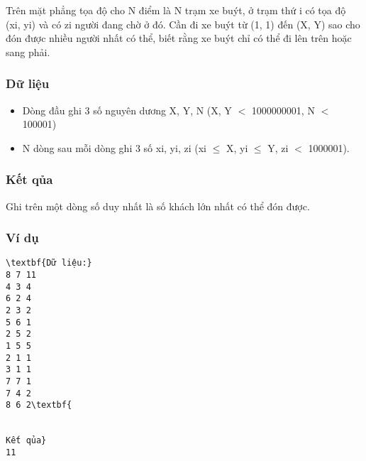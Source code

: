 



   Trên mặt phẳng tọa độ cho N điểm là N trạm xe buýt, ở trạm thứ i có tọa độ (xi, yi) và có zi người đang chờ ở đó. Cần đi xe buýt từ (1, 1) đến (X, Y) sao cho đón được nhiều người nhất có thể, biết rằng xe buýt chỉ có thể đi lên trên hoặc sang phải.  

\subsubsection{   Dữ liệu  }
\begin{itemize}
	\item     Dòng đầu ghi 3 số nguyên dương X, Y, N (X, Y $<$ 1000000001, N $<$ 100001)   
	\item     N dòng sau mỗi dòng ghi 3 số xi, yi, zi (xi  $\le$  X, yi  $\le$  Y, zi $<$ 1000001).   
\end{itemize}

\subsubsection{   Kết qủa  }

   Ghi trên một dòng số duy nhất là số khách lớn nhất có thể đón được.  

\subsubsection{   Ví dụ  }
\begin{verbatim}
\textbf{Dữ liệu:} 
8 7 11
4 3 4
6 2 4
2 3 2
5 6 1
2 5 2
1 5 5
2 1 1
3 1 1
7 7 1
7 4 2
8 6 2\textbf{


Kết qủa} 
11
\end{verbatim}
